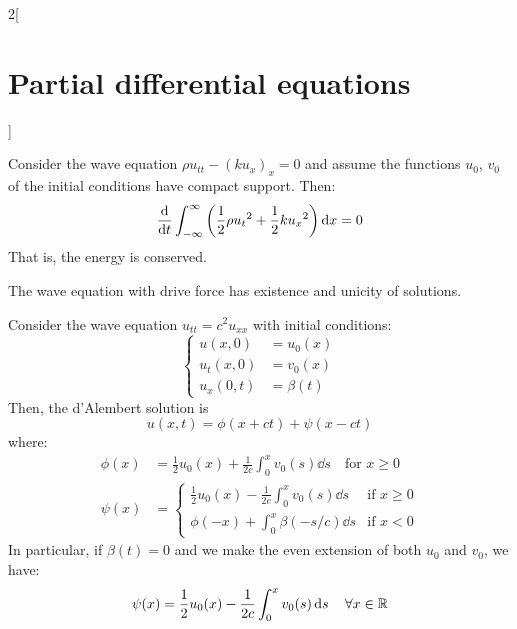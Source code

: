 \documentclass[../../../main_math.tex]{subfiles}
\begin{document}
\begin{multicols}{2}[\section{Partial differential equations}]
\begin{proposition}
    \begin{center}
      \begin{minipage}{\linewidth}
        \centering
        
        \label{PDE_waves-char}
      \end{minipage}
    \end{center}
  \end{proposition}
  \begin{proposition}
    Consider the wave equation $\rho u_{tt}-{(ku_x)}_x=0$ and assume the functions $u_0$, $v_0$ of the initial conditions have compact support. Then: $$\dv{}{t}\int_{-\infty}^\infty\left(\frac{1}{2}\rho{u_t}^2+\frac{1}{2}k{u_x}^2\right)\dd{x}=0$$ That is, the energy is conserved.
  \end{proposition}
  \begin{corollary}
    The wave equation with drive force has existence and unicity of solutions.
  \end{corollary}
  \begin{proposition}
    Consider the wave equation $u_{tt}=c^2u_{xx}$ with initial conditions:
    $$
      \left\{
      \begin{aligned}
        u(x,0)   & =u_0(x)   \\
        u_t(x,0) & =v_0(x)   \\
        u_x(0,t) & =\beta(t)
      \end{aligned}
      \right.
    $$
    Then, the d'Alembert solution is $$u(x,t)=\phi(x+ct)+\psi(x-ct)$$ where:
    \begin{align*}
      \phi(x) & =\frac{1}{2}u_0(x)+\frac{1}{2c}\int_0^xv_0(s)\dd{s}\quad\text{for }x\geq 0 \\
      \psi(x) & =
      \begin{cases}
        \displaystyle\frac{1}{2}u_0(x)-\frac{1}{2c}\int_0^xv_0(s)\dd{s} & \text{if } x\geq 0 \\
        \displaystyle\phi(-x)+\int_0^x\beta(-s/c)\dd{s}                 & \text{if } x< 0
      \end{cases}
    \end{align*}
    In particular, if $\beta(t)=0$ and we make the even extension of both $u_0$ and $v_0$, we have:
    \begin{equation*}
      \psi(x) =\frac{1}{2}u_0(x)-\frac{1}{2c}\int_0^xv_0(s)\dd{s} \quad\forall x\in\mathbb{R}
    \end{equation*}
  \end{proposition}

\end{multicols}
\end{document}
